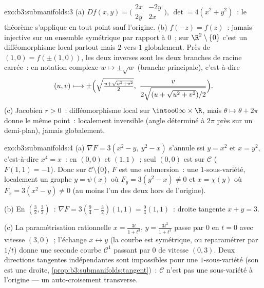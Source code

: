 \begin{solution}{exo:b3:submanifolds:3}
(a) $Df(x,y) = \bigl(\begin{smallmatrix}2x & -2y\\ 2y &
2x\end{smallmatrix}\bigr)$, $\det = 4(x^2 + y^2)$~: le
théorème s'applique en tout point sauf l'origine.
(b) $f(-z) = f(z)$~: jamais injective sur un ensemble
symétrique par rapport à $0$~; sur $\R^2\setminus\{0\}$ c'est
un difféomorphisme local partout mais $2$-vers-$1$
globalement. Près de $(1, 0) = f(\pm(1, 0))$, les deux
inverses sont les deux branches de racine carrée~: en
notation complexe $w \mapsto \pm\sqrt w$ (branche
principale), c'est-à-dire
\[
(u, v) \longmapsto \pm\Bigl(\sqrt{\tfrac{u +
\sqrt{u^2+v^2}}{2}},\ \frac{v}{2\sqrt{(u +
\sqrt{u^2+v^2})/2}}\Bigr).
\]
(c) Jacobien $r > 0$~: difféomorphisme local sur
$\intoo0\infty\times\R$, mais $\theta \mapsto \theta + 2\pi$
donne le même point~: localement inversible (angle déterminé
à $2\pi$ près sur un demi-plan), jamais globalement.
\end{solution}

\begin{solution}{exo:b3:submanifolds:4}
(a) $\nabla F = 3(x^2 - y,\ y^2 - x)$ s'annule ssi $y = x^2$
et $x = y^2$, c'est-à-dire $x^4 = x$~: en $(0,0)$ et $(1,1)$~;
seul $(0,0)$ est sur $\mathcal C$ ($F(1,1) = -1$). Donc sur
$\mathcal C\setminus\{0\}$, $F$ est une submersion~: une
$1$-sous-variété, localement un graphe $y = \psi(x)$ où $F_y
= 3(y^2 - x) \neq 0$ et $x = \chi(y)$ où $F_x = 3(x^2 - y)
\neq 0$ (au moins l'un des deux hors de l'origine).

(b) En $(\frac32, \frac32)$~: $\nabla F = 3(\frac94 -
\frac32)(1, 1) = \frac94(1,1)$~: droite tangente $x + y =
3$.

(c) La paramétrisation rationnelle $x = \frac{3t}{1 + t^3}$,
$y = \frac{3t^2}{1+t^3}$ passe par $0$ en $t = 0$ avec
vitesse $(3, 0)$~; l'échange $x \leftrightarrow y$ (la courbe
est symétrique, ou reparamétrer par $1/t$) donne une seconde
courbe $\mathcal C^1$ passant par $0$ de vitesse $(0, 3)$.
Deux directions tangentes indépendantes sont impossibles pour
une $1$-sous-variété (son  est une droite,
\cref{prop:b3:submanifolds:tangent})~: $\mathcal C$ n'est
pas une sous-variété à l'origine --- un auto-croisement
transverse.
\end{solution}

